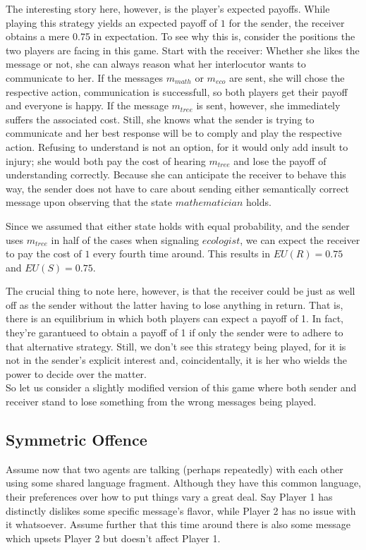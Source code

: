 \documentclass{article}
\begin{document}
The interesting story here, however, is the player's expected payoffs. While playing this strategy yields an expected payoff of $1$ for the sender, the receiver obtains a mere 0.75 in expectation. To see why this is, consider the positions the two players are facing in this game. Start with the receiver: Whether she likes the message or not, she can always reason what her interlocutor wants to communicate to her. If the messages $m_{math}$ or $m_{eco}$ are sent, she will chose the respective action, communication is successfull, so both players get their payoff and everyone is happy. If the message $m_{tree}$ is sent, however, she immediately suffers the associated cost. Still, she knows what the sender is trying to communicate and her best response will be to comply and play the respective action. Refusing to understand is not an option, for it would only add insult to injury; she would both pay the cost of hearing $m_{tree}$ and lose the payoff of understanding correctly. Because she can anticipate the receiver to behave this way, the sender does not have to care about sending either semantically correct message upon observing that the state $mathematician$ holds.

Since we assumed that either state holds with equal probability, and the sender uses $m_{tree}$ in half of the cases when signaling $ecologist$, we can expect the receiver to pay the cost of $1$ every fourth time around. This results in $EU(R)=0.75$ and $EU(S)=0.75$.

The crucial thing to note here, however, is that the receiver could be just as well off as the sender without the latter having to lose anything in return. That is, there is an equilibrium in which both players can expect a payoff of 1. In fact, they're garantueed to obtain a payoff of 1 if only the sender were to adhere to that alternative strategy. Still, we don't see this strategy being played, for it is not in the sender's explicit interest and, coincidentally, it is her who wields the power to decide over the matter.\\
So let us consider a slightly modified version of this game where both sender and receiver stand to lose something from the wrong messages being played.
\subsection{Symmetric Offence}
Assume now that two agents are talking (perhaps repeatedly) with each other using some shared language fragment. Although they have this common language, their preferences over how to put things vary a great deal. Say Player 1 has distinctly dislikes some specific message's flavor, while Player 2 has no issue with it whatsoever. Assume further that this time around there is also some message which upsets Player 2 but doesn't affect Player 1.
\end{document}

